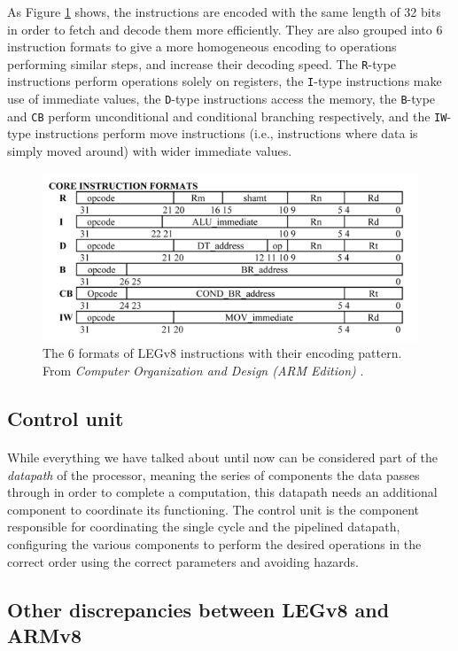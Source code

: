 As Figure \ref{fig:legv8instrencod} shows, the instructions are encoded with the same length of 32 bits in order to fetch and decode them more efficiently. They are also grouped into 6 instruction formats to give a more homogeneous encoding to operations performing similar steps, and increase their decoding speed.
The \verb|R|-type instructions perform operations solely on registers, the \verb|I|-type instructions make use of immediate values, the \verb|D|-type instructions access the memory, the \verb|B|-type and \verb|CB| perform unconditional and conditional branching respectively, and the \verb|IW|-type instructions perform move instructions (i.e., instructions where data is simply moved around) with wider immediate values.
\begin{figure}[H]
	\centering
	\includegraphics[width=1\textwidth]{img/instruction_types.png}
	\caption{The 6 formats of LEGv8 instructions with their encoding pattern. From \emph{Computer Organization and Design (ARM Edition)} \cite{patterson2016computer}.}
 \label{fig:legv8instrencod}
\end{figure}
\subsection{Control unit}
\paragraph{}
While everything we have talked about until now can be considered part of the \emph{datapath} of the processor, meaning the series of components the data passes through in order to complete a computation, this datapath needs an additional component to coordinate its functioning. The control unit is the component responsible for coordinating the single cycle and the pipelined datapath, configuring the various components to perform the desired operations in the correct order using the correct parameters and avoiding hazards.
\subsection{Other discrepancies between LEGv8 and ARMv8}
